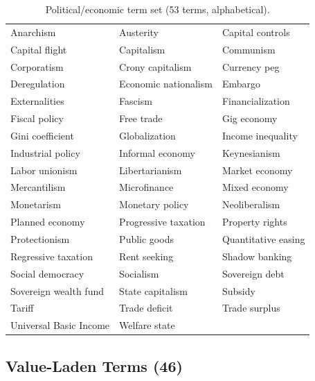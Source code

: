\documentclass[11pt, letterpaper]{article}
\begin{document}
\begin{table}[H]
  \centering
  \footnotesize
  \begin{tabular}{p{}p{}p{}}
    Anarchism & Austerity & Capital controls \\
    Capital flight & Capitalism & Communism \\
    Corporatism & Crony capitalism & Currency peg \\
    Deregulation & Economic nationalism & Embargo \\
    Externalities & Fascism & Financialization \\
    Fiscal policy & Free trade & Gig economy \\
    Gini coefficient & Globalization & Income inequality \\
    Industrial policy & Informal economy & Keynesianism \\
    Labor unionism & Libertarianism & Market economy \\
    Mercantilism & Microfinance & Mixed economy \\
    Monetarism & Monetary policy & Neoliberalism \\
    Planned economy & Progressive taxation & Property rights \\
    Protectionism & Public goods & Quantitative easing \\
    Regressive taxation & Rent seeking & Shadow banking \\
    Social democracy & Socialism & Sovereign debt \\
    Sovereign wealth fund & State capitalism & Subsidy \\
    Tariff & Trade deficit & Trade surplus \\
    Universal Basic Income & Welfare state & \\
  \end{tabular}
  \caption{Political/economic term set (53 terms, alphabetical).}
  \label{tab:terms_political}
\end{table}

\subsection{Value-Laden Terms (46)}
\end{document}
